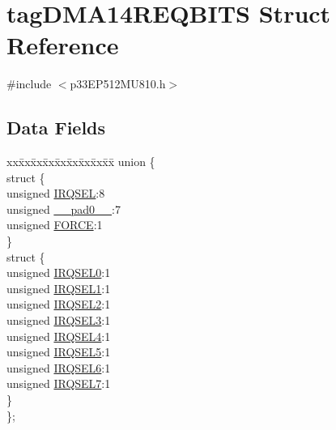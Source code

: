 \hypertarget{structtag_d_m_a14_r_e_q_b_i_t_s}{}\section{tag\+D\+M\+A14\+R\+E\+Q\+B\+I\+TS Struct Reference}
\label{structtag_d_m_a14_r_e_q_b_i_t_s}


{\ttfamily \#include $<$p33\+E\+P512\+M\+U810.\+h$>$}

\subsection*{Data Fields}
\begin{DoxyCompactItemize}
\item 
\begin{tabbing}
xx\=xx\=xx\=xx\=xx\=xx\=xx\=xx\=xx\=\kill
union \{\\
\>struct \{\\
\>\>unsigned \hyperlink{structtag_d_m_a14_r_e_q_b_i_t_s_a5e70ba01366ab2f37371d52661dd93b2}{IRQSEL}:8\\
\>\>unsigned \hyperlink{structtag_d_m_a14_r_e_q_b_i_t_s_adf71f3d8410c1f1dbbc96680a92c49af}{\_\_pad0\_\_}:7\\
\>\>unsigned \hyperlink{structtag_d_m_a14_r_e_q_b_i_t_s_a9b378a7ffc1ab4bc4a3710fb36389180}{FORCE}:1\\
\>\} \\
\>struct \{\\
\>\>unsigned \hyperlink{structtag_d_m_a14_r_e_q_b_i_t_s_ac73241b8f783760c9192dfd8a0773cad}{IRQSEL0}:1\\
\>\>unsigned \hyperlink{structtag_d_m_a14_r_e_q_b_i_t_s_a45e1f083e5a8a59f25acc35910732426}{IRQSEL1}:1\\
\>\>unsigned \hyperlink{structtag_d_m_a14_r_e_q_b_i_t_s_a60dda7474727b3624ca25fa0067a8924}{IRQSEL2}:1\\
\>\>unsigned \hyperlink{structtag_d_m_a14_r_e_q_b_i_t_s_aeaafe1b8c89398ed382054ab628aed78}{IRQSEL3}:1\\
\>\>unsigned \hyperlink{structtag_d_m_a14_r_e_q_b_i_t_s_a91c4162e0f3d4ac7adcdb49302f19840}{IRQSEL4}:1\\
\>\>unsigned \hyperlink{structtag_d_m_a14_r_e_q_b_i_t_s_a6382d50430464cf20b3dee3dbf2e8c01}{IRQSEL5}:1\\
\>\>unsigned \hyperlink{structtag_d_m_a14_r_e_q_b_i_t_s_ace52408ef8c29561f3c56a3fbcbc8217}{IRQSEL6}:1\\
\>\>unsigned \hyperlink{structtag_d_m_a14_r_e_q_b_i_t_s_acce7dedecdf1f53cdbead3edf7c5d53a}{IRQSEL7}:1\\
\>\} \\
\}; \\

\end{tabbing}\end{DoxyCompactItemize}


